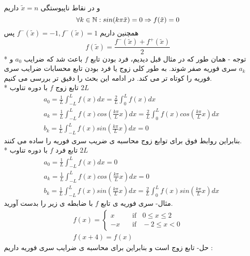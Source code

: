و در نقاط ناپیوستگی
$\tilde{x}=n$
داریم 
\[
\forall k\in\mathbb{N}: sin(k\pi \tilde{x})=0\Rightarrow f(\tilde{x})=0
\]
همچنین داریم
$f^-\left(\tilde{x}\right)=-1 ,f^-\left(\tilde{x}\right)=1$
پس
\[
f\left(\tilde{x}\right)=\frac{f^-\left(\tilde{x}\right)+f^+\left(\tilde{x}\right)}{2}
\]
* توجه - همان طور که در مثال قبل دیدیم، فرد بودن تابع 
$f$
باعث شد که ضرایب
$a_0$
و 
$a_k$
سری فوریه صفر شوند. به طور کلی زوج یا فرد بودن تابع محسابات ضرایب سری فوریه را کوتاه تر می کند. در ادامه این بحث را دقیق تر بررسی می کنیم.\\
* تابع زوج 
$f$
با دوره تناوب
$2L$
\begin{equation*}
	\begin{aligned}
		{} &\
		a_0=\frac{1}{L}\int_{-L}^L{f(x)dx}=\frac{2}{L}\int_{0}^L{f(x)dx}
		\\ &\
		a_k=\frac{1}{L}\int_{-L}^L{f(x)cos\left(\frac{k\pi}{L}x\right)dx}=\frac{2}{L}\int_{0}^L{f(x)cos\left(\frac{k\pi}{L}x\right)dx}
		\\ &\
		b_k=\frac{1}{L}\int_{-L}^L{f(x)sin\left(\frac{k\pi}{L}x\right)dx}=0
	\end{aligned}
\end{equation*}
بنابراین روابط فوق برای توابع زوج محاسبه ی ضریب سری فوریه را ساده می کنند.\\
* تابع فرد 
$f$
با دوره تناوب 
$2L$
\begin{equation*}
	\begin{aligned}
		{} &\
		a_0=\frac{1}{L}\int_{-L}^L{f(x)dx}=0
		\\ &\
		a_k=\frac{1}{L}\int_{-L}^L{f(x)cos\left(\frac{k\pi}{L}x\right)dx}=0
		\\ &\
		b_k=\frac{1}{L}\int_{-L}^L{f(x)sin\left(\frac{k\pi}{L}x\right)dx}=\frac{2}{L}\int_{0}^L{f(x)sin\left(\frac{k\pi}{L}x\right)dx}
	\end{aligned}
\end{equation*}
مثال- سری فوریه ی تابع
$f$
با ضابطه ی زیر را بدست آورید.
\begin{equation*}
	\begin{gathered}
		f(x) =
		\begin{cases}
			x       & \quad \text{if }\;\; 0\le x\le 2 \\
			-x  & \quad \text{if }\;\; -2\le x< 0
		\end{cases}\\
	f(x+4)=f(x)
	\end{gathered}
\end{equation*}
حل- تابع زوج است و بنابراین برای محاسبه ی ضرایب سری فوریه داریم :
